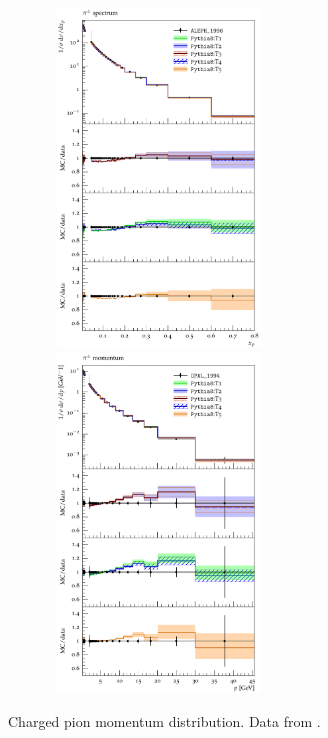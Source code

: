 \documentclass[aps,preprint,floatfix,nofootinbib,showpacs]{revtex4-1}
\begin{document}
 
 \begin{figure}[btp]
 \centering
 \includegraphics[width=8cm, height=9cm]{ALEPH_1996/d25-x01-y01.pdf}
 \hfill
  \includegraphics[width=8cm, height=9cm]{OPAL_1994/d01-x01-y01.pdf}
  \caption{Charged pion momentum distribution. Data from \cite{Barate:1996fi, Akers:1994ez}.}
  \label{Fig-5}
 \end{figure}
 
\end{document}
